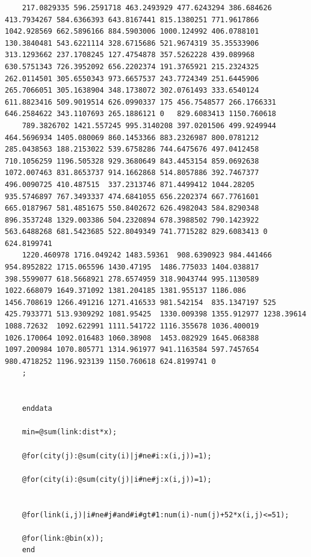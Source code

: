 \documentclass[UTF8]{ctexart}
\begin{document}
\begin{lstlisting}
	217.0829335	596.2591718	463.2493929	477.6243294	386.684626	413.7934267	584.6366393	643.8167441	815.1380251	771.9617866	1042.928569	662.5896166	884.5903006	1000.124992	406.0788101	130.3840481	543.6221114	328.6715686	521.9674319	35.35533906	313.1293662	237.1708245	127.4754878	357.5262228	439.089968	630.5751343	726.3952092	656.2202374	191.3765921	215.2324325	262.0114501	305.6550343	973.6657537	243.7724349	251.6445906	265.7066051	305.1638904	348.1738072	302.0761493	333.6540124	611.8823416	509.9019514	626.0990337	175	456.7548577	266.1766331	646.2584622	343.1107693	265.1886121	0	829.6083413	1150.760618
	789.3826702	1421.557245	995.3140208	397.0201506	499.9249944	464.5696934	1405.080069	860.1453366	883.2326987	800.0781212	285.0438563	188.2153022	539.6758286	744.6475676	497.0412458	710.1056259	1196.505328	929.3680649	843.4453154	859.0692638	1072.007463	831.8653737	914.1662868	514.8057886	392.7467377	496.0090725	410.487515	337.2313746	871.4499412	1044.28205	935.5746897	767.3493337	474.6841055	656.2202374	667.7761601	665.0187967	581.4851675	550.8402672	626.4982043	584.8290348	896.3537248	1329.003386	504.2320894	678.3988502	790.1423922	563.6488268	681.5423685	522.8049349	741.7715282	829.6083413	0	624.8199741
	1220.460978	1716.049242	1483.59361	908.6390923	984.441466	954.8952822	1715.065596	1430.47195	1486.775033	1404.038817	398.5599077	618.5668921	278.6574959	318.9043744	995.1130589	1022.668079	1649.371092	1381.204185	1381.955137	1186.086	1456.708619	1266.491216	1271.416533	981.542154	835.1347197	525	425.7933771	513.9309292	1081.95425	1330.009398	1355.912977	1238.39614	1088.72632	1092.622991	1111.541722	1116.355678	1036.400019	1026.170064	1092.016483	1060.38908	1453.082929	1645.068388	1097.200984	1070.805771	1314.961977	941.1163584	597.7457654	980.4718252	1196.923139	1150.760618	624.8199741	0
	;
	
	
	enddata

	min=@sum(link:dist*x);

	@for(city(j):@sum(city(i)|j#ne#i:x(i,j))=1);

	@for(city(i):@sum(city(j)|i#ne#j:x(i,j))=1);


	@for(link(i,j)|i#ne#j#and#i#gt#1:num(i)-num(j)+52*x(i,j)<=51);

	@for(link:@bin(x));
	end
	
	
	\end{lstlisting}
	
	
	
	
	
\end{document}
